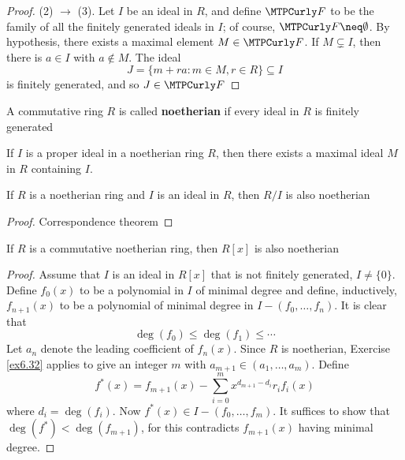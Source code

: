 \documentclass[11pt]{article}
\begin{document}
\begin{proof}
(2) \(\to\) (3). Let \(I\) be an ideal in \(R\), and define \(\calf\) to be the
family of all the finitely generated ideals in \(I\); of course,
\(\calf\neq\emptyset\). By hypothesis, there exists a maximal element
\(M\in\calf\). If \(M\subsetneq I\), then there is \(a\in I\) with 
\(a\not\in M\). The ideal
\begin{equation*}
J=\{m+ra:m\in M,r\in R\}\subseteq I
\end{equation*}
is finitely generated, and so \(J\in\calf\)
\end{proof}

\begin{definition}[]
A commutative ring \(R\) is called \textbf{noetherian} if every ideal in \(R\) is finitely generated
\end{definition}

\begin{corollary}[]
If \(I\) is a proper ideal in a noetherian ring \(R\), then there exists a
maximal ideal \(M\) in \(R\) containing \(I\).
\end{corollary}

\begin{corollary}[]
If \(R\) is a noetherian ring and \(I\) is an ideal in \(R\), then \(R/I\) is also
noetherian 
\end{corollary}

\begin{proof}
Correspondence theorem
\end{proof}

\begin{theorem}
If \(R\) is a commutative noetherian ring, then \(R[x]\) is also noetherian
\end{theorem}

\begin{proof}
Assume that \(I\) is an ideal in \(R[x]\) that is not finitely generated,
\(I\neq\{0\}\). Define \(f_0(x)\) to be a polynomial in \(I\) of minimal degree
and define, inductively, \(f_{n+1}(x)\) to be a polynomial of minimal degree
in \(I-(f_0,\dots,f_n)\). It is clear that 
\begin{equation*}
\deg(f_0)\le\deg(f_1)\le\cdots
\end{equation*}
Let \(a_n\) denote the leading coefficient of \(f_n(x)\). Since \(R\) is
noetherian, Exercise \ref{ex6.32} applies to give an integer \(m\) with
\(a_{m+1}\in(a_1,\dots,a_m)\). Define
\begin{equation*}
f^*(x)=f_{m+1}(x)-\displaystyle\sum_{i=0}^mx^{d_{m+1}-d_i}r_if_i(x)
\end{equation*}
where \(d_i=\deg(f_i)\). Now \(f^*(x)\in I-(f_0,\dots,f_m)\). It suffices to
show that \(\deg(f^*)<\deg(f_{m+1})\), for this contradicts \(f_{m+1}(x)\)
having minimal degree.
\end{proof}
\end{document}

